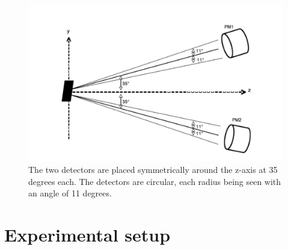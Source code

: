 \documentclass[10pt,swedish, openany]{book}
\begin{document}
\begin{figure}[h]
\includegraphics[scale=0.5]{TwoDetectors.png}
\centering
\caption{The two detectors are placed symmetrically around the z-axis at 35 degrees each. The detectors are circular, each radius being seen with an angle of 11 degrees.}
\label{fig:TwoDetectors}
\end{figure}

\chapter{Experimental setup}
\label{chapter:ExperimentalSetup}
\end{document}
